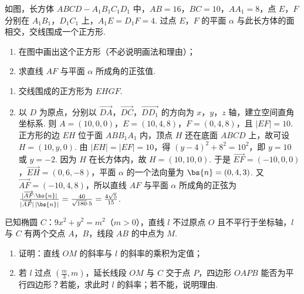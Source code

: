 \begin{problem}
如图，长方体 \(ABCD-A_1B_1C_1D_1\) 中，\(AB=16\)，\(BC=10\)，\(AA_1=8\)，点 \(E\)，\(F\) 分别在 \(A_1B_1\)，\(D_1C_1\) 上，\(A_1E=D_1F=4\). 过点 \(E\)，\(F\) 的平面 \(\alpha\) 与此长方体的面相交，交线围成一个正方形.

\begin{enumerate}
\item 在图中画出这个正方形（不必说明画法和理由）；
\item 求直线 \(AF\) 与平面 \(\alpha\) 所成角的正弦值.
\end{enumerate}

\end{problem}

\begin{solution}
\begin{enumerate}
\item 交线围成的正方形为 \(EHGF\).
\item 以 \(D\) 为原点，分别以 \(\overrightarrow{DA}\)，\(\overrightarrow{DC}\)，\(\overrightarrow{DD_1}\) 的方向为 \(x\)，\(y\)，\(z\) 轴，建立空间直角坐标系. 则 \(A=(10,0,0)\)，\(E=(10,4,8)\)，\(F=(0,4,8)\)，且 \(|EF|=10\). 正方形的边 \(EH\) 位于面 \(ABB_1A_1\) 内，顶点 \(H\) 还在底面 \(ABCD\) 上，故可设 \(H=(10,y,0)\). 由 \(|EH|=|EF|=10\)，得 \((y-4)^2+8^2=10^2\)，即 \(y=10\) 或 \(y=-2\). 因为 \(H\) 在长方体内，故 \(H=(10,10,0)\). 于是 \(\overrightarrow{EF}=(-10,0,0)\)，\(\overrightarrow{EH}=(0,6,-8)\)，平面 \(\alpha\) 的一个法向量为 \(\bs{n}=(0,4,3)\). 又 \(\overrightarrow{AF}=(-10,4,8)\)，所以直线 \(AF\) 与平面 \(\alpha\) 所成角的正弦为 \(\frac{|\overrightarrow{AF}\cdot\bs{n}|}{|\overrightarrow{AF}|\,|\bs{n}|}=\frac{40}{\sqrt{180}\cdot5}=\frac{4\sqrt5}{15}\).
\end{enumerate}
\end{solution}

\begin{problem}
已知椭圆 \(C\)：\(9x^2+y^2=m^2\)（\(m>0\)），直线 \(l\) 不过原点 \(O\) 且不平行于坐标轴，\(l\) 与 \(C\) 有两个交点 \(A\)，\(B\)，线段 \(AB\) 的中点为 \(M\).

\begin{enumerate}
\item 证明：直线 \(OM\) 的斜率与 \(l\) 的斜率的乘积为定值；
\item 若 \(l\) 过点 \(\left(\frac{m}{3},m\right)\)，延长线段 \(OM\) 与 \(C\) 交于点 \(P\)，四边形 \(OAPB\) 能否为平行四边形？若能，求此时 \(l\) 的斜率；若不能，说明理由.
\end{enumerate}
\end{problem}

